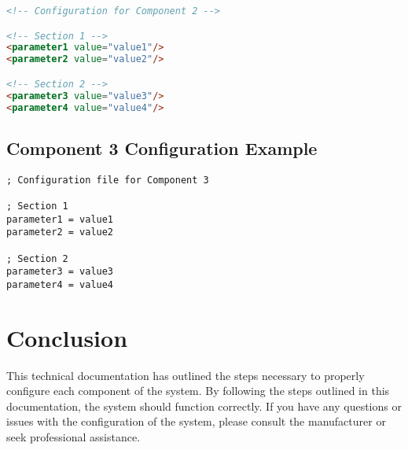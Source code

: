 \begin{lstlisting}[language=html]
<!-- Configuration for Component 2 -->

<!-- Section 1 -->
<parameter1 value="value1"/>
<parameter2 value="value2"/>

<!-- Section 2 -->
<parameter3 value="value3"/>
<parameter4 value="value4"/>
\end{lstlisting}

\subsection{Component 3 Configuration Example}

\begin{lstlisting}
; Configuration file for Component 3

; Section 1
parameter1 = value1
parameter2 = value2

; Section 2
parameter3 = value3
parameter4 = value4
\end{lstlisting}

\section{Conclusion}

This technical documentation has outlined the steps necessary to properly configure each component of the system. By following the steps outlined in this documentation, the system should function correctly. If you have any questions or issues with the configuration of the system, please consult the manufacturer or seek professional assistance.


